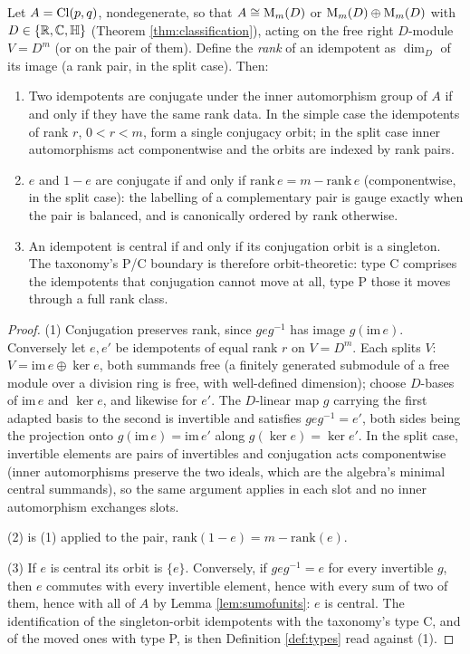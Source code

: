 \begin{theorem}\label{thm:orbits}
Let $A = \mathrm{Cl}(p,q)$, nondegenerate, so that $A \cong \mathrm{M}_m(D)$ or $\mathrm{M}_m(D) \oplus \mathrm{M}_m(D)$ with $D \in \{\mathbb{R}, \mathbb{C}, \mathbb{H}\}$ (Theorem \ref{thm:classification}), acting on the free right $D$-module $V = D^m$ (or on the pair of them). Define the \emph{rank} of an idempotent as $\dim_D$ of its image (a rank pair, in the split case). Then:
\begin{enumerate}
\item Two idempotents are conjugate under the inner automorphism group of $A$ if and only if they have the same rank data. In the simple case the idempotents of rank $r$, $0 < r < m$, form a single conjugacy orbit; in the split case inner automorphisms act componentwise and the orbits are indexed by rank pairs.
\item $e$ and $1 - e$ are conjugate if and only if $\mathrm{rank}\, e = m - \mathrm{rank}\, e$ (componentwise, in the split case): the labelling of a complementary pair is gauge exactly when the pair is balanced, and is canonically ordered by rank otherwise.
\item An idempotent is central if and only if its conjugation orbit is a singleton. The taxonomy's P/C boundary is therefore orbit-theoretic: type C comprises the idempotents that conjugation cannot move at all, type P those it moves through a full rank class.
\end{enumerate}
\end{theorem}

\begin{proof}
(1) Conjugation preserves rank, since $geg^{-1}$ has image $g(\mathrm{im}\, e)$. Conversely let $e, e'$ be idempotents of equal rank $r$ on $V = D^m$. Each splits $V$: $V = \mathrm{im}\,e \oplus \ker e$, both summands free (a finitely generated submodule of a free module over a division ring is free, with well-defined dimension); choose $D$-bases of $\mathrm{im}\,e$ and $\ker e$, and likewise for $e'$. The $D$-linear map $g$ carrying the first adapted basis to the second is invertible and satisfies $g e g^{-1} = e'$, both sides being the projection onto $g(\mathrm{im}\,e) = \mathrm{im}\,e'$ along $g(\ker e) = \ker e'$. In the split case, invertible elements are pairs of invertibles and conjugation acts componentwise (inner automorphisms preserve the two ideals, which are the algebra's minimal central summands), so the same argument applies in each slot and no inner automorphism exchanges slots.

(2) is (1) applied to the pair, $\mathrm{rank}(1-e) = m - \mathrm{rank}(e)$.

(3) If $e$ is central its orbit is $\{e\}$. Conversely, if $geg^{-1} = e$ for every invertible $g$, then $e$ commutes with every invertible element, hence with every sum of two of them, hence with all of $A$ by Lemma \ref{lem:sumofunits}: $e$ is central. The identification of the singleton-orbit idempotents with the taxonomy's type C, and of the moved ones with type P, is then Definition \ref{def:types} read against (1).
\end{proof}


